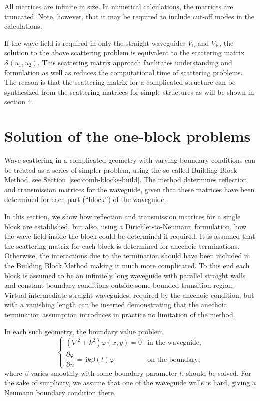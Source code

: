 \documentclass{svjour3}
\renewcommand{\phi}{\varphi}
\renewcommand{\i}{\,\mathrm{i}}
\newcommand{\pd}[2]{\dfrac{\partial#1}{\partial#2}}
\begin{document}
All matrices are infinite in size. In numerical calculations, the
matrices are truncated. Note, however, that it may be required to
include cut-off modes in the calculations.

If the wave field is required in only the straight waveguides
$V_{\text{L}}$ and $V_{\text{R}}$, the solution to the above
scattering problem is equivalent to the scattering matrix
$\mathcal{S}(u_1,u_2)$. This scattering matrix approach facilitates
understanding and formulation as well as reduces the computational
time of scattering problems. The reason is that the scattering matrix
for a complicated structure can be synthesized from the scattering
matrices for simple structures as will be shown in section 4.

\section{Solution of the one-block problems}
\label{sec:oneblock}

Wave scattering in a complicated geometry with varying boundary
conditions can be treated as a series of simpler problem, using the so
called Building Block Method, see
Section~\ref{sec:comb-blocks-build}. The method determines reflection
and transmission matrices for the waveguide, given that these matrices
have been determined for each part (``block'') of the waveguide.

In this section, we show how reflection and transmission matrices for
a single block are established, but also, using a Dirichlet-to-Neumann
formulation, how the wave field inside the block could be determined
if required. It is assumed that the scattering matrix for each block
is determined for anechoic terminations. Otherwise, the interactions
due to the termination should have been included in the Building Block
Method making it much more complicated. To this end each block is
assumed to be an infinitely long waveguide with parallel straight
walls and constant boundary conditions outside some bounded transition
region. Virtual intermediate straight waveguides, required by the
anechoic condition, but with a vanishing length can be inserted
\cite{nilssonbrander1981b} demonstrating that the anechoic termination
assumption introduces in practice no limitation of the method.

In each such geometry, the boundary value problem
\begin{equation}
  \label{eq:bvp1}
  \begin{cases}
    \left(\nabla^2+k^2\right)\phi(x,y)=0&\text{in the waveguide,}\\[1ex]
    \pd \phi n=\i k\beta(t)\phi&\text{on the boundary,}
  \end{cases}
\end{equation}
where $\beta$ varies smoothly with some boundary parameter $t$, should
be solved. For the sake of simplicity, we assume that one of the
waveguide walls is hard, giving a Neumann boundary condition there.
\end{document}
